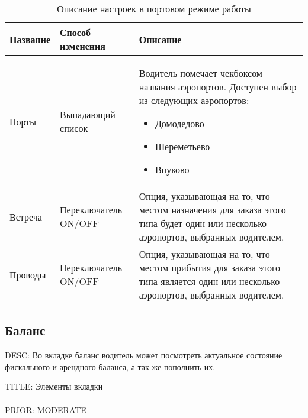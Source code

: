       \begin{table}
          \begin{center}
          \caption {Описание настроек в портовом режиме работы}
          \label{table:driver_app_robot_tab_table_port_mode}
          \setlength{\extrarowheight}{2mm}
          \begin{tabular}{|p{4cm}|p{3cm}|p{8cm}|}

            \hline     \textbf{Название}&\textbf{Способ изменения}&\textbf{Описание} \\ [2mm]

            \hline   Порты & Выпадающий список & Водитель помечает чекбоксом названия аэропортов. Доступен выбор из следующих аэропортов: \begin{itemize} \item Домодедово \item Шереметьево \item Внуково \end{itemize} \\ [2mm]

            \hline   Встреча & Переключатель ON/OFF & Опция, указывающая на то, что местом назначения для заказа этого типа будет один или несколько аэропортов, выбранных водителем. \\ [2mm]

            \hline   Проводы & Переключатель ON/OFF & Опция, указывающая на то, что местом прибытия для заказа этого типа является один или несколько аэропортов, выбранных водителем. \\ [2mm]

            \hline
          \end{tabular}
          \end{center}
      \end{table}

  \subsection{Баланс}

    DESC: Во вкладке баланс водитель может посмотреть актуальное состояние фискального и арендного баланса, а так же пополнить их. 

      TITLE: Элементы вкладки\\
      \\
      PRIOR: MODERATE\\

